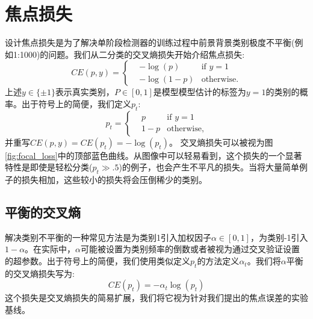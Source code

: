 \documentclass{ctexart}
\begin{document}
\section{焦点损失}
设计焦点损失是为了解决单阶段检测器的训练过程中前景背景类别极度不平衡(例如1:1000)的问题。我们从二分类的交叉熵损失开始介绍焦点损失:
\begin{equation}
    CE(p, y)=\left\{
    \begin{aligned}
         & -\log(p)   & \text{if }y=1     \\
         & -\log(1-p) & \text{otherwise.}
    \end{aligned}
    \right.
\end{equation}
上述$y\in \{ \pm 1 \}$表示真实类别，$P \in [0,1]$是模型模型估计的标签为$y=1$的类别的概率。出于符号上的简便，我们定义$p_t$:
\begin{equation}
    p_t = \left\{
    \begin{aligned}
         & p     & \text{if }y=1     \\
         & 1 - p & \text{otherwise,}
    \end{aligned}
    \right.
\end{equation}
并重写$CE(p, y)=CE(p_t)=-\log(p_t)$。\newline
交叉熵损失可以被视为图\ref{fig:focal_loss}中的顶部蓝色曲线。从图像中可以轻易看到，这个损失的一个显著特性是即使是轻松分类($p_t\gg .5$)的例子，也会产生不平凡的损失。当将大量简单例子的损失相加，这些较小的损失将会压倒稀少的类别。\newline
\subsection{平衡的交叉熵}
解决类别不平衡的一种常见方法是为类别1引入加权因子$\alpha \in [0, 1]$，为类别-1引入$1-\alpha$。在实际中，$\alpha$可能被设置为类别频率的倒数或者被视为通过交叉验证设置的超参数。出于符号上的简便，我们使用类似定义$p_t$的方法定义$\alpha_t$。我们将$\alpha$平衡的交叉熵损失写为:
\begin{equation}
    CE(p_t)=-\alpha_t\log(p_t)
\end{equation}
这个损失是交叉熵损失的简易扩展，我们将它视为针对我们提出的焦点误差的实验基线。
\end{document}
